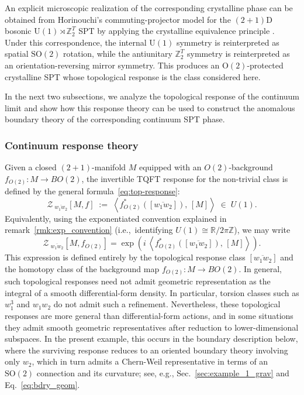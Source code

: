 \documentclass[aps,prx,reprint,superscriptaddress,twocolumn,amsmath,amssymb,amsfonts, nofootinbib]{revtex4-2}
\newcommand{\U}{\text{U}}
\newcommand{\SO}{\text{SO}}
\theoremstyle{apsstyle}
\begin{document}
\bigskip 

An explicit microscopic realization of the corresponding crystalline phase can be obtained from Horinouchi's commuting-projector model for the $(2{+}1)$D bosonic $\U(1)\rtimes\mathbb Z_2^T$ SPT by applying the crystalline equivalence principle \cite{Horinouchi2020,ThorngrenElse}. Under this correspondence, the internal $\U(1)$ symmetry is reinterpreted as spatial $\SO(2)$ rotation, while the antiunitary $\mathbb Z_2^T$ symmetry is reinterpreted as an orientation-reversing mirror symmetry. This produces an $\mathrm O(2)$-protected crystalline SPT whose topological response is the class considered here.

\bigskip 

\noindent In the next two subsections, we analyze the topological response of the continuum limit and show how this response theory can be used to construct the anomalous boundary theory of the corresponding continuum SPT phase.

\subsubsection{Continuum response theory}

Given a closed $(2{+}1)$-manifold $M$ equipped with an $O(2)$-background $f_{O(2)}:M\to BO(2)$, the invertible TQFT response for the non-trivial class is defined by the general formula~\eqref{eq:top-response}:
\begin{equation}
  \mathcal Z_{\;\overline{w_1w_2}}\left[M,f\right]
  \;:=\;
  \left\langle f_{O(2)}^{*}([\overline{w_1w_2}]),\, [M] \right\rangle
  \;\in\; U(1).
\end{equation}
Equivalently, using the exponentiated convention explained in remark~\ref{rmk:exp_convention} (i.e.,\ identifying $U(1)\cong \mathbb R/2\pi \mathbb Z$), we may write
\begin{equation*}
\mathcal Z_{\;\overline{w_1w_2}}\left[M,f_{O(2)}\right]
= \exp\left(i\,\left\langle f_{O(2)}^{*}(\left[\overline{w_1w_2}\right]),\,[M]\right\rangle\right).
\end{equation*} This expression is defined entirely by the topological response class $[\overline{w_1w_2}]$ and the homotopy class of the background map $f_{O(2)}:M\to BO(2)$. In general, such topological responses need not admit geometric representation as the integral of a smooth differential-form density. In particular, torsion classes such as $w_1^3$ and $w_1w_2$ do not admit such a refinement. Nevertheless, these topological responses are more general than differential-form actions, and in some situations they admit smooth geometric representatives after reduction to lower-dimensional subspaces. In the present example, this occurs in the boundary description below, where the surviving response reduces to an oriented boundary theory involving only $w_2$, which in turn admits a Chern-Weil representative in terms of an $\SO(2)$ connection and its curvature; see, e.g., Sec.~\ref{sec:example_1_grav} and Eq.~\ref{eq:bdry_geom}.
\end{document}
